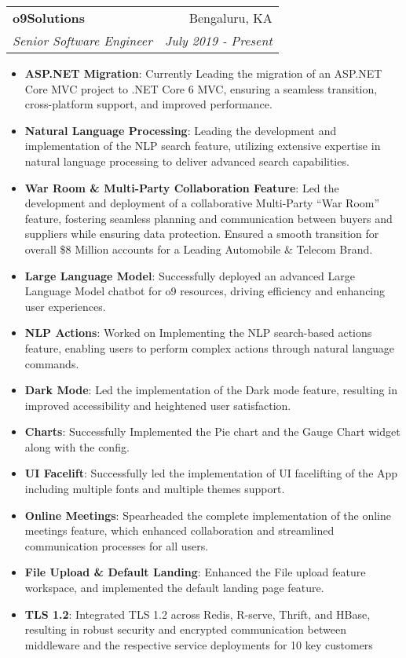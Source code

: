 \documentclass[letterpaper,11pt]{article}
\makeatletter
\newcommand{\resumeItem}[2]{
  \item\small{
    \textbf{#1}{: #2 \vspace{-2pt}}
  }
}
\newcommand{\resumeSubheading}[4]{
  \vspace{-1pt}\item
    \begin{tabular*}{0.97\textwidth}[t]{l@{\extracolsep{\fill}}r}
      \textbf{#1} & #2 \\
      \textit{\small#3} & \textit{\small #4} \\
    \end{tabular*}\vspace{-5pt}
}
\newcommand{\resumeSubSubheading}[2]{
    \begin{tabular*}{0.97\textwidth}{l@{\extracolsep{\fill}}r}
      \textit{\small#1} & \textit{\small #2} \\
    \end{tabular*}\vspace{-5pt}
}
\newcommand{\resumeSubHeadingListEnd}{\end{itemize}}
\newcommand{\resumeItemListStart}{\begin{itemize}}
\newcommand{\resumeItemListEnd}{\end{itemize}\vspace{-5pt}}
\makeatother
\begin{document}
    \resumeSubheading
      {o9Solutions}{Bengaluru, KA}
      {Senior Software Engineer}{July 2019 - Present}
      \resumeItemListStart
      \resumeItem{ASP.NET Migration}
          {Currently Leading the migration of an ASP.NET Core MVC project to .NET Core 6 MVC, ensuring a seamless transition, cross-platform support, and improved performance.}
        \resumeItem{Natural Language Processing}
          {Leading the development and implementation of the NLP
search feature, utilizing extensive expertise in natural language
processing to deliver advanced search capabilities.}
        \resumeItem{War Room \& Multi-Party Collaboration Feature}
          {Led the development and deployment of a collaborative Multi-Party “War Room” feature, fostering seamless planning and communication between buyers and suppliers while ensuring data protection. Ensured a smooth transition for overall \$8 Million accounts for a Leading Automobile \& Telecom Brand. }
        \resumeItem{Large Language Model}
          {Successfully deployed an advanced Large Language Model chatbot for
o9 resources, driving efficiency and enhancing user experiences.}
         \resumeItem{NLP Actions}
          {Worked on Implementing the NLP search-based actions feature,
enabling users to perform complex actions through natural language
commands.}
        \resumeItem{Dark Mode}
          {Led the implementation of the Dark mode feature, resulting in
improved accessibility and heightened user satisfaction.}
        \resumeItem{Charts}
          {Successfully Implemented the Pie chart and the Gauge Chart widget
along with the config.}
        \resumeItem{UI Facelift}
          {Successfully led the implementation of UI facelifting of the App
including multiple fonts and multiple themes support.}
        \resumeItem{Online Meetings}
          {Spearheaded the complete implementation of the online meetings
feature, which enhanced collaboration and streamlined
communication processes for all users.}
         \resumeItem{File Upload \& Default Landing}
            {Enhanced the File upload feature workspace, and implemented the default landing page feature.}
        \resumeItem{TLS 1.2}
         {Integrated TLS 1.2 across Redis, R-serve, Thrift, and HBase, resulting in robust security and encrypted communication between middleware and the respective service deployments for 10 key customers}
        
      \resumeItemListEnd
      
\end{document}
